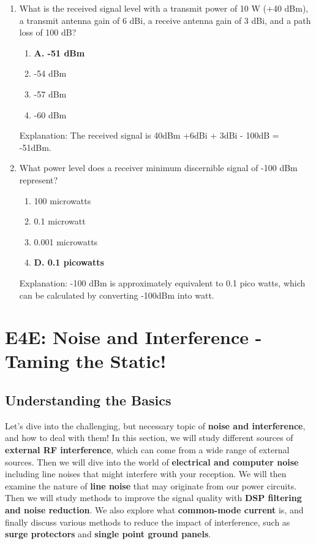 \begin{enumerate}
   \item What is the received signal level with a transmit power of 10 W (+40 dBm), a transmit antenna gain of 6 dBi, a receive antenna gain of 3 dBi, and a path loss of 100 dB?
       \begin{enumerate}
     \item \textbf{A. -51 dBm}
      \item  -54 dBm
       \item  -57 dBm
        \item  -60 dBm
       \end{enumerate}
   \textcolor{myred}{Explanation:}
    The received signal is 40dBm +6dBi + 3dBi - 100dB = -51dBm.
     
        \item What power level does a receiver minimum discernible signal of -100 dBm represent?
        \begin{enumerate}
      \item  100 microwatts
      \item  0.1 microwatt
     \item  0.001 microwatts
        \item \textbf{D. 0.1 picowatts}
       \end{enumerate}
    \textcolor{myred}{Explanation:}
      -100 dBm is approximately equivalent to 0.1 pico watts, which can be calculated by converting -100dBm into watt.
\end{enumerate}


\section{E4E: Noise and Interference - Taming the Static!}

\subsection*{Understanding the Basics}
Let's dive into the challenging, but necessary topic of \textcolor{myblue}{\textbf{noise and interference}}, and how to deal with them! In this section, we will study different sources of \textcolor{myblue}{\textbf{external RF interference}}, which can come from a wide range of external sources. Then we will dive into the world of \textcolor{myblue}{\textbf{electrical and computer noise}} including line noises that might interfere with your reception. We will then examine the nature of \textcolor{myblue}{\textbf{line noise}} that may originate from our power circuits. Then we will study methods to improve the signal quality with \textcolor{myblue}{\textbf{DSP filtering and noise reduction}}. We also explore what \textcolor{myblue}{\textbf{common-mode current}} is, and finally discuss various methods to reduce the impact of interference, such as \textcolor{myblue}{\textbf{surge protectors}} and \textcolor{myblue}{\textbf{single point ground panels}}.

